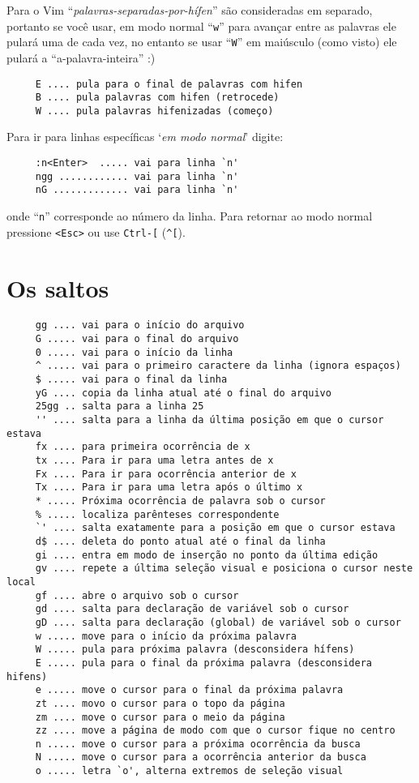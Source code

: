 Para o Vim ``{\em{palavras-separadas-por-hífen}}'' são consideradas em separado, portanto se você usar,
em modo normal ``\verb+w+'' para avançar entre as palavras ele pulará uma de
cada vez, no entanto se usar ``\verb+W+''
em maiúsculo (como visto) ele pulará a ``a-palavra-inteira'' :)

\begin{verbatim}
     E .... pula para o final de palavras com hifen
     B .... pula palavras com hifen (retrocede)
     W .... pula palavras hifenizadas (começo)
\end{verbatim}



Para ir para linhas específicas `{\em em modo normal}' digite:

\begin{verbatim}
     :n<Enter>  ..... vai para linha `n'
     ngg ............ vai para linha `n'
     nG ............. vai para linha `n'
\end{verbatim}

onde ``\verb|n|'' corresponde ao número da linha.  Para retornar ao modo normal
pressione \verb|<Esc>| ou use \verb|Ctrl-[| (\verb|^[|).

\section{Os saltos}\label{Os saltos}

\begin{verbatim}
     gg .... vai para o início do arquivo
     G ..... vai para o final do arquivo
     0 ..... vai para o início da linha
     ^ ..... vai para o primeiro caractere da linha (ignora espaços)
     $ ..... vai para o final da linha
     yG .... copia da linha atual até o final do arquivo
     25gg .. salta para a linha 25
     '' .... salta para a linha da última posição em que o cursor estava
     fx .... para primeira ocorrência de x
     tx .... Para ir para uma letra antes de x
     Fx .... Para ir para ocorrência anterior de x
     Tx .... Para ir para uma letra após o último x
     * ..... Próxima ocorrência de palavra sob o cursor
     % ..... localiza parênteses correspondente
     `' .... salta exatamente para a posição em que o cursor estava
     d$ .... deleta do ponto atual até o final da linha
     gi .... entra em modo de inserção no ponto da última edição
     gv .... repete a última seleção visual e posiciona o cursor neste local
     gf .... abre o arquivo sob o cursor
     gd .... salta para declaração de variável sob o cursor
     gD .... salta para declaração (global) de variável sob o cursor
     w ..... move para o início da próxima palavra
     W ..... pula para próxima palavra (desconsidera hífens)
     E ..... pula para o final da próxima palavra (desconsidera hifens)
     e ..... move o cursor para o final da próxima palavra
     zt .... movo o cursor para o topo da página
     zm .... move o cursor para o meio da página
     zz .... move a página de modo com que o cursor fique no centro
     n ..... move o cursor para a próxima ocorrência da busca
     N ..... move o cursor para a ocorrência anterior da busca
     o ..... letra `o', alterna extremos de seleção visual
\end{verbatim}

